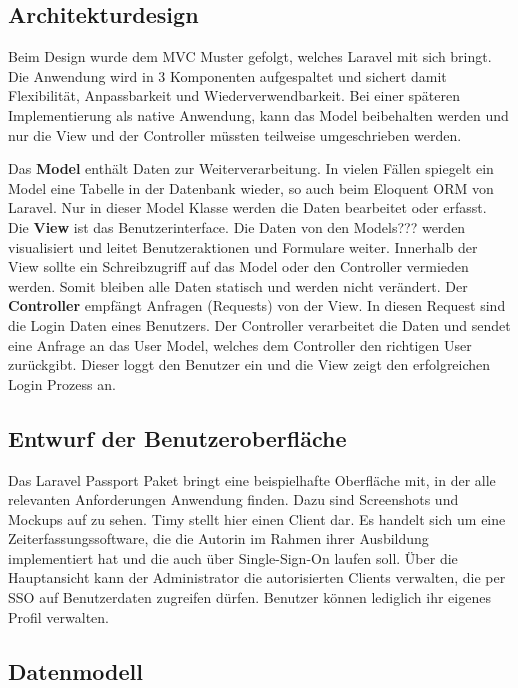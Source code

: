 \subsection{Architekturdesign}
\label{sec:Architekturdesign}

Beim Design wurde dem \ac{MVC} Muster gefolgt, welches Laravel mit sich bringt. Die Anwendung wird in 3 Komponenten aufgespaltet und sichert damit Flexibilität, Anpassbarkeit und Wiederverwendbarkeit.
Bei einer späteren Implementierung als native Anwendung, kann das Model beibehalten werden und nur die View und der Controller müssten teilweise umgeschrieben werden.

Das \textbf{Model} enthält Daten zur Weiterverarbeitung. In vielen Fällen spiegelt ein Model eine Tabelle in der Datenbank wieder, so auch beim Eloquent \ac{ORM} von Laravel. Nur in dieser Model Klasse werden die Daten bearbeitet oder erfasst. 
Die \textbf{View} ist das Benutzerinterface. Die Daten von den Models??? werden visualisiert und leitet \zB Benutzeraktionen und Formulare weiter. Innerhalb der View sollte ein Schreibzugriff auf das Model oder den Controller vermieden werden. Somit bleiben alle Daten statisch und werden nicht verändert.
Der \textbf{Controller} empfängt Anfragen (Requests) von der View. In diesen Request sind \bspw die Login Daten eines Benutzers. Der Controller verarbeitet die Daten und sendet eine Anfrage an das User Model, welches dem Controller den richtigen User zurückgibt. Dieser loggt den Benutzer ein und die View zeigt den erfolgreichen Login Prozess an. 

\subsection{Entwurf der Benutzeroberfläche}
\label{sec:Benutzeroberflaeche} 

Das Laravel Passport Paket bringt eine beispielhafte Oberfläche mit, in der alle relevanten Anforderungen Anwendung finden. 
Dazu sind Screenshots und Mockups auf   zu sehen. Timy stellt hier einen Client dar. Es handelt sich um eine Zeiterfassungssoftware, die die Autorin im Rahmen ihrer Ausbildung implementiert hat und die auch über Single-Sign-On laufen soll. 
Über die Hauptansicht kann der Administrator die autorisierten Clients verwalten, die per \ac{SSO} auf  Benutzerdaten zugreifen dürfen. Benutzer können lediglich ihr eigenes Profil verwalten.

\subsection{Datenmodell}
\label{sec:Datenmodell}

